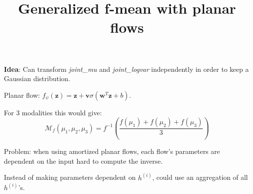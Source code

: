\documentclass[11pt]{article}
\title{Generalized f-mean with planar flows}
\date{}
\begin{document}
    \maketitle
    \textbf{Idea}: Can transform \textit{joint\_mu} and \textit{joint\_logvar} independently in order to keep a Gaussian distribution.

    Planar flow: $f_{\psi}(\textbf{z}) = \textbf{z} + \textbf{v}\sigma (\textbf{w}^T\textbf{z} + b)$.

    \vspace{\baselineskip}

    For 3 modalities this would give:
    \begin{equation}
        \mathcal{M}_f(\mu _1,\mu_2, \mu _3) = f^{-1}(\frac{f(\mu _1) + f(\mu _2) + f(\mu _3)}{3})
    \end{equation}

    Problem: when using amortized planar flows, each flow's parameters are dependent on the input \textrightarrow
    hard to compute the inverse.

    \vspace{\baselineskip}

    Instead of making parameters dependent on $h^{(i)}$, could use an aggregation of all $h^{(i)}$'s.


    \printbibliography
\end{document}
